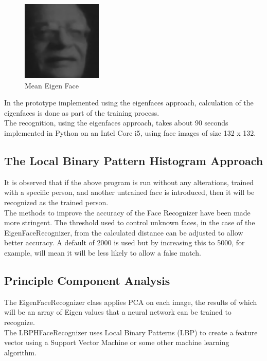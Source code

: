 \documentclass[conference]{IEEEtran}
\begin{document}
\begin{figure}[!t]
\centering
\includegraphics[width=1.5in]{./gulzar.png}
\caption{Mean Eigen Face}
\label{fig:meigenface}
\end{figure}

In the prototype implemented using the eigenfaces approach, calculation of the
eigenfaces is done as part of the training process. \\
The recognition, using the eigenfaces approach, takes about 90 seconds
implemented in Python on an Intel Core i5, using face images of size 132 x 132. \\

\subsection{The Local Binary Pattern Histogram Approach}
It is observed that if the above program is run without any alterations,
trained with a specific person, and another untrained face is introduced,
then it will be recognized as the trained person. \\
The methods to improve the accuracy of the Face Recognizer have been made more
stringent. The threshold used to control unknown faces, in the case of the
EigenFaceRecognizer, from the calculated distance can be adjusted to allow better
accuracy. A default of 2000 is used but by increasing this to 5000, for example,
will mean it will be less likely to allow a false match. \\

\subsection{Principle Component Analysis}
The EigenFaceRecognizer class applies PCA on each image, the results of which will
be an array of Eigen values that a neural network can be trained to recognize. \\
The LBPHFaceRecognizer uses Local Binary Patterns (LBP) to create a feature vector
using a Support Vector Machine or some other machine learning algorithm. \\
\end{document}
